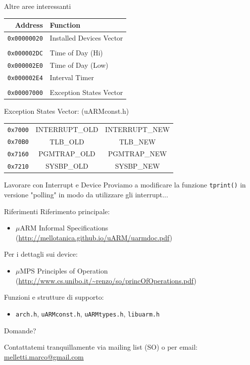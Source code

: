 \documentclass{beamer}
\begin{document}
\begin{frame}{Altre aree interessanti}
\small
\begin{tabular}{r|l}
	Address & Function \\
	\hline
	\texttt{0x00000020} & Installed Devices Vector \\
	\\
	\texttt{0x000002DC} & Time of Day (Hi) \\
	\texttt{0x000002E0} & Time of Day (Low) \\
	\texttt{0x000002E4} & Interval Timer \\
	\\
	\texttt{0x00007000} & Exception States Vector \\
\end{tabular}

\vfill

Exception States Vector: \hfill(uARMconst.h)

\vspace{5px}
\begin{tabular}{r|c|c|}
\cline{2-3}
\footnotesize\texttt{0x7000} & INTERRUPT\_OLD & INTERRUPT\_NEW \\
\cline{2-3}
\footnotesize\texttt{0x70B0} & TLB\_OLD & TLB\_NEW \\
\cline{2-3}
\footnotesize\texttt{0x7160} & PGMTRAP\_OLD & PGMTRAP\_NEW \\
\cline{2-3}
\footnotesize\texttt{0x7210} & SYSBP\_OLD & SYSBP\_NEW \\
\cline{2-3}
\end{tabular}
\end{frame}

\begin{frame}{Lavorare con Interrupt e Device}
Proviamo a modificare la funzione \texttt{tprint()} in versione "polling" in modo da utilizzare gli interrupt... 
\end{frame}

\begin{frame}{Riferimenti}
Riferimento principale:

\begin{itemize}
\item $\mu$ARM Informal Specifications \small(\url{http://mellotanica.github.io/uARM/uarmdoc.pdf})
\end{itemize}

\vfill
Per i dettagli sui device:

\begin{itemize}
\item $\mu$MPS Principles of Operation \small(\url{http://www.cs.unibo.it/~renzo/so/princOfOperations.pdf})
\end{itemize}

\vfill
Funzioni e strutture di supporto:

\begin{itemize}
\item \texttt{arch.h}, \texttt{uARMconst.h}, \texttt{uARMtypes.h}, \texttt{libuarm.h}
\end{itemize}

\end{frame}

\begin{frame}

\vfill

\center\huge Domande?

\vfill
\normalsize Contattatemi tranquillamente via mailing list (SO) o per email: \url{melletti.marco@gmail.com}

\end{frame}
\end{document}
